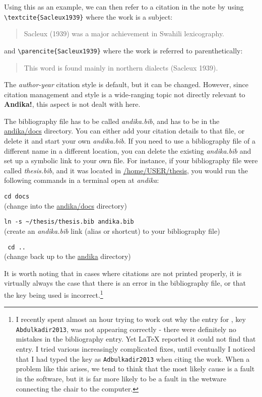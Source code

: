 Using this as an example, we can then refer to a citation in the note by using \verb|\textcite{Sacleux1939}| where the work is a subject:
\begin{quotation}
Sacleux (1939) was a major achievement in Swahili lexicography.
\end{quotation}
and \verb|\parencite{Sacleux1939}| where the work is referred to parenthetically:
\begin{quotation}
This word is found mainly in northern dialects (Sacleux 1939).
\end{quotation}

The \textit{author-year} citation style is default, but it can be changed.  However, since citation management and style is a wide-ranging topic not directly relevant to \textbf{Andika!}, this aspect is not dealt with here.

The bibliography file has to be called \textit{andika.bib}, and has to be in the \url{andika/docs} directory.  You can either add your citation details to that file, or delete it and start your own \textit{andika.bib}.  If you need to use a bibliography file of a different name in a different location, you can delete the existing \textit{andika.bib} and set up a symbolic link to your own file.  For instance, if your bibliography file were called \textit{thesis.bib}, and it was located in \url{/home/USER/thesis}, you would run the following commands in a terminal open at \textit{andika}:

\verb|cd docs|\\
(change into the \url{andika/docs} directory)

\verb|ln -s ~/thesis/thesis.bib andika.bib|\\
(create an \textit{andika.bib} link (alias or shortcut) to your bibliography file)

\verb| cd ..|\\
(change back up to the \url{andika} directory)

It is worth noting that in cases where citations are not printed properly, it is virtually always the case that there is an error in the bibliography file, or that the key being used is incorrect.\footnote{I recently spent almost an hour trying to work out why the entry for \citet{Abdulkadir2013}, key \texttt{Abdulkadir2013}, was not appearing correctly - there were definitely no mistakes in the bibliography entry.  Yet LaTeX reported it could not find that entry.  I tried various increasingly complicated fixes, until eventually I noticed that I had typed the key as \texttt{Adbulkadir2013} when citing the work.  When a problem like this arises, we tend to think that the most likely cause is a fault in the software, but it is far more likely to be a fault in the wetware connecting the chair to the computer.}


